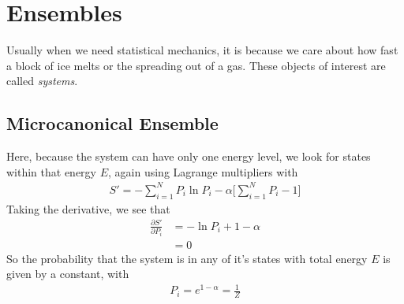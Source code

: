 \section{Ensembles}
Usually when we need statistical mechanics, it is because we care about how fast a block of ice melts or the spreading out of a gas. These objects of interest are called \emph{systems}. %

\subsection{Microcanonical Ensemble}
Here, because the system can have only one energy level, we look for states within that energy $E$, again using Lagrange multipliers with
\begin{align}
    S' = -\sum_{i=1}^N P_i\ln P_i - \alpha\Big[\sum_{i=1}^N P_i -1\Big]
\end{align}
Taking the derivative, we see that
\begin{align}
    \frac{\partial S'}{\partial P_i} &= -\ln P_i  + 1 -\alpha\\
 &= 0 
\end{align}
So the probability that the system is in any of it's states with total energy $E$ is given by a constant, with
\begin{align}
    P_i = e^{1-\alpha} = \frac{1}{Z}
\end{align}


